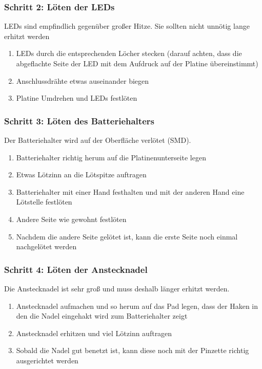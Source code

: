 \documentclass[10pt]{beamer}
\begin{document}
	\begin{frame}
	\frametitle{Schritt 2: Löten der LEDs}
	LEDs sind empfindlich gegenüber großer Hitze. Sie sollten nicht unnötig lange erhitzt werden
	\begin{enumerate} 
		\item{LEDs durch die entsprechenden Löcher stecken (darauf achten, dass die abgeflachte Seite der LED mit dem Aufdruck auf der Platine übereinstimmt)}
		\item{Anschlussdrähte etwas auseinander biegen}
		\item{Platine Umdrehen und LEDs festlöten}
	\end{enumerate}
	\end{frame}

	\begin{frame}
	\frametitle{Schritt 3: Löten des Batteriehalters}
	Der Batteriehalter wird auf der Oberfläche verlötet (SMD).
	\begin{enumerate} 
		\item{Batteriehalter richtig herum auf die Platinenunterseite legen}
		\item{Etwas Lötzinn an die Lötspitze auftragen}
		\item{Batteriehalter mit einer Hand festhalten und mit der anderen Hand eine Lötstelle festlöten}
		\item{Andere Seite wie gewohnt festlöten}
		\item{Nachdem die andere Seite gelötet ist, kann die erste Seite noch einmal nachgelötet werden}
	\end{enumerate}
	\end{frame}

	\begin{frame}
	\frametitle{Schritt 4: Löten der Anstecknadel}
	Die Anstecknadel ist sehr groß und muss deshalb länger erhitzt werden.
	\begin{enumerate} 
		\item{Anstecknadel aufmachen und so herum auf das Pad legen, dass der Haken in den die Nadel eingehakt wird zum Batteriehalter zeigt}
		\item{Anstecknadel erhitzen und viel Lötzinn auftragen}
		\item{Sobald die Nadel gut benetzt ist, kann diese noch mit der Pinzette richtig ausgerichtet werden}
	\end{enumerate}
	\end{frame}
\end{document}
